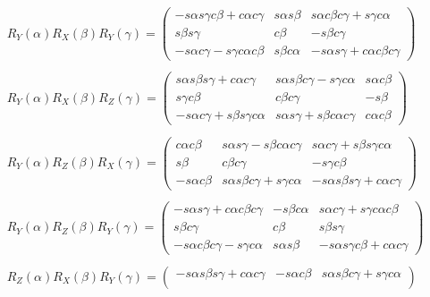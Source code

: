\documentclass[10pt, letterpaper]{report}
\begin{document}
\begin{eqnarray*}
R_{Y}(\alpha)R_{X}(\beta)R_{Y}(\gamma)=\begin{pmatrix}
- s \alpha s \gamma c \beta +  c \alpha c \gamma &  s \alpha s \beta &  s \alpha c \beta c \gamma +  s \gamma c \alpha \\ 
 s \beta s \gamma &  c \beta & - s \beta c \gamma \\ 
- s \alpha c \gamma -  s \gamma c \alpha c \beta &  s \beta c \alpha & - s \alpha s \gamma +  c \alpha c \beta c \gamma 
\end{pmatrix} \\ \\ 
R_{Y}(\alpha)R_{X}(\beta)R_{Z}(\gamma)=\begin{pmatrix}
 s \alpha s \beta s \gamma +  c \alpha c \gamma &  s \alpha s \beta c \gamma -  s \gamma c \alpha &  s \alpha c \beta \\ 
 s \gamma c \beta &  c \beta c \gamma & - s \beta \\ 
- s \alpha c \gamma +  s \beta s \gamma c \alpha &  s \alpha s \gamma +  s \beta c \alpha c \gamma &  c \alpha c \beta 
\end{pmatrix} \\ \\ 
R_{Y}(\alpha)R_{Z}(\beta)R_{X}(\gamma)=\begin{pmatrix}
 c \alpha c \beta &  s \alpha s \gamma -  s \beta c \alpha c \gamma &  s \alpha c \gamma +  s \beta s \gamma c \alpha \\ 
 s \beta &  c \beta c \gamma & - s \gamma c \beta \\ 
- s \alpha c \beta &  s \alpha s \beta c \gamma +  s \gamma c \alpha & - s \alpha s \beta s \gamma +  c \alpha c \gamma 
\end{pmatrix} \\ \\ 
R_{Y}(\alpha)R_{Z}(\beta)R_{Y}(\gamma)=\begin{pmatrix}
- s \alpha s \gamma +  c \alpha c \beta c \gamma & - s \beta c \alpha &  s \alpha c \gamma +  s \gamma c \alpha c \beta \\ 
 s \beta c \gamma &  c \beta &  s \beta s \gamma \\ 
- s \alpha c \beta c \gamma -  s \gamma c \alpha &  s \alpha s \beta & - s \alpha s \gamma c \beta +  c \alpha c \gamma 
\end{pmatrix} \\ \\ 
R_{Z}(\alpha)R_{X}(\beta)R_{Y}(\gamma)=\begin{pmatrix}
- s \alpha s \beta s \gamma +  c \alpha c \gamma & - s \alpha c \beta &  s \alpha s \beta c \gamma +  s \gamma c \alpha \\ 

\end{pmatrix}
\end{eqnarray*}
\end{document}
